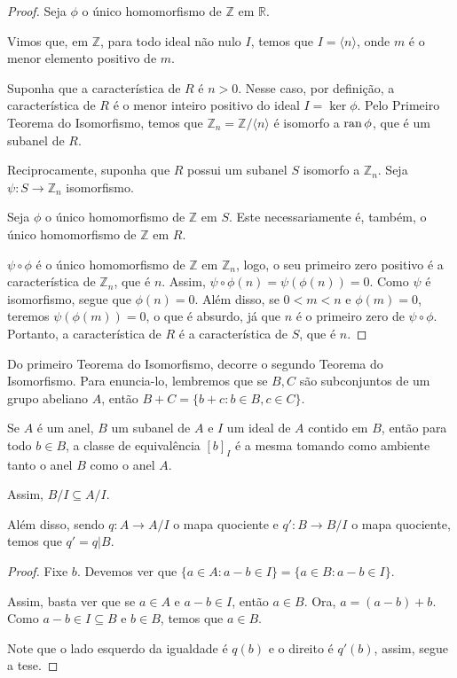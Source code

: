 \begin{proof}
Seja $\phi$ o único homomorfismo de $\mathbb Z$ em $\mathbb R$.

Vimos que, em $\mathbb Z$, para todo ideal não nulo $I$, temos que $I=\langle n\rangle$, onde $m$ é o menor elemento positivo de $m$.

Suponha que a característica de $R$ é $n>0$.
Nesse caso, por definição, a característica de $R$ é o menor inteiro positivo do ideal $I=\ker \phi$.
Pelo Primeiro Teorema do Isomorfismo, temos que $\mathbb Z_n=\mathbb Z/\langle n\rangle$ é isomorfo a $\operatorname{ran} \phi$, que é um subanel de $R$.

Reciprocamente, suponha que $R$ possui um subanel $S$ isomorfo a $\mathbb Z_n$.
Seja $\psi:S\rightarrow \mathbb Z_n$ isomorfismo.

Seja $\phi$ o único homomorfismo de $\mathbb Z$ em $S$.
Este necessariamente é, também, o único homomorfismo de $\mathbb Z$ em $R$.

$\psi\circ \phi$ é o único homomorfismo de $\mathbb Z$ em $\mathbb Z_n$, logo, o seu primeiro zero positivo é a característica de $\mathbb Z_n$, que é $n$.
Assim, $\psi\circ\phi(n)=\psi(\phi(n))=0$.
Como $\psi$ é isomorfismo, segue que $\phi(n)=0$.
Além disso, se $0<m<n$ e $\phi(m)=0$, teremos $\psi(\phi(m))=0$, o que é absurdo, já que $n$ é o primeiro zero de $\psi\circ \phi$.
Portanto, a característica de $R$ é a característica de $S$, que é $n$.
\end{proof}

Do primeiro Teorema do Isomorfismo, decorre o segundo Teorema do Isomorfismo.
Para enuncia-lo, lembremos que se $B, C$ são subconjuntos de um grupo abeliano $A$, então $B+C=\{b+c: b \in B, c \in C\}$.

\begin{lemma}
Se $A$ é um anel, $B$ um subanel de $A$ e $I$ um ideal de $A$ contido em $B$, então para todo $b\in B$, a classe de equivalência $[b]_I$ é a mesma tomando como ambiente tanto o anel $B$ como o anel $A$.

Assim, $B/I\subseteq A/I$.

Além disso, sendo $q:A\rightarrow A/I$ o mapa quociente e $q':B\rightarrow B/I$ o mapa quociente, temos que $q'=q|B$.
\end{lemma}

\begin{proof}
    Fixe $b$.
    Devemos ver que $\{a \in A: a-b\in I\}=\{a \in B: a-b\in I\}$.

    Assim, basta ver que se $a \in A$ e $a-b \in I$, então $a \in B$.
    Ora, $a=(a-b)+b$.
    Como $a-b \in I\subseteq B$ e $b \in B$, temos que $a \in B$.

    Note que o lado esquerdo da igualdade é $q(b)$ e o direito é $q'(b)$, assim, segue a tese.
\end{proof}


